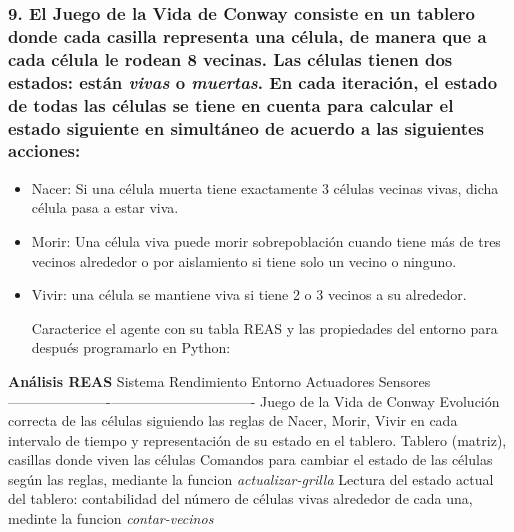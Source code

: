 \documentclass[11pt]{article}
\begin{document}
    \subsubsection{\texorpdfstring{9. El Juego de la Vida de Conway consiste
en un tablero donde cada casilla representa una célula, de manera que a
cada célula le rodean 8 vecinas. Las células tienen dos estados: están
\emph{vivas} o \emph{muertas}. En cada iteración, el estado de todas las
células se tiene en cuenta para calcular el estado siguiente en
simultáneo de acuerdo a las siguientes
acciones:}{9. El Juego de la Vida de Conway consiste en un tablero donde cada casilla representa una célula, de manera que a cada célula le rodean 8 vecinas. Las células tienen dos estados: están vivas o muertas. En cada iteración, el estado de todas las células se tiene en cuenta para calcular el estado siguiente en simultáneo de acuerdo a las siguientes acciones:}}\label{el-juego-de-la-vida-de-conway-consiste-en-un-tablero-donde-cada-casilla-representa-una-cuxe9lula-de-manera-que-a-cada-cuxe9lula-le-rodean-8-vecinas.-las-cuxe9lulas-tienen-dos-estados-estuxe1n-vivas-o-muertas.-en-cada-iteraciuxf3n-el-estado-de-todas-las-cuxe9lulas-se-tiene-en-cuenta-para-calcular-el-estado-siguiente-en-simultuxe1neo-de-acuerdo-a-las-siguientes-acciones}

\begin{itemize}
\item
  Nacer: Si una célula muerta tiene exactamente 3 células vecinas vivas,
  dicha célula pasa a estar viva.
\item
  Morir: Una célula viva puede morir sobrepoblación cuando tiene más de
  tres vecinos alrededor o por aislamiento si tiene solo un vecino o
  ninguno.
\item
  Vivir: una célula se mantiene viva si tiene 2 o 3 vecinos a su
  alrededor.

  Caracterice el agente con su tabla REAS y las propiedades del entorno
  para después programarlo en Python:
\end{itemize}

    \textbf{Análisis REAS} \textbar{} Sistema \textbar{} Rendimiento
\textbar{} Entorno \textbar{} Actuadores \textbar{} Sensores \textbar{}
\textbar---------\textbar-------------\textbar---------\textbar------------\textbar----------\textbar{}
\textbar{} Juego de la Vida de Conway \textbar{} Evolución correcta de
las células siguiendo las reglas de Nacer, Morir, Vivir en cada
intervalo de tiempo y representación de su estado en el tablero.
\textbar{} Tablero (matriz), casillas donde viven las células \textbar{}
Comandos para cambiar el estado de las células según las reglas,
mediante la funcion \emph{actualizar-grilla} \textbar{} Lectura del
estado actual del tablero: contabilidad del número de células vivas
alrededor de cada una, medinte la funcion \emph{contar-vecinos}
\textbar{}
\end{document}
